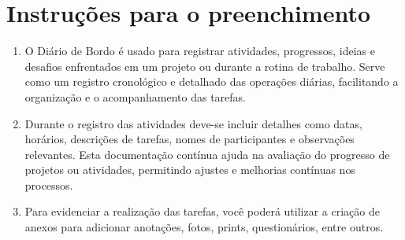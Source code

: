 \documentclass[
landscape,
  a4paper,%
  12pt,%
  english,%
  brazilian,%
]{article}
\begin{document}





\section*{Instruções para o preenchimento}
\doublespacing
\begin{enumerate}
    \item O Diário de Bordo é usado para registrar atividades, progressos, ideias e desafios enfrentados em um projeto ou durante a rotina de trabalho. Serve como um registro cronológico e detalhado das operações diárias, facilitando a organização e o acompanhamento das tarefas.
    \doublespacing
    \item Durante o registro das atividades deve-se incluir detalhes como datas, horários, descrições de tarefas, nomes de participantes e observações relevantes.  Esta documentação contínua ajuda na avaliação do progresso de projetos ou atividades, permitindo ajustes e melhorias contínuas nos processos.
    \doublespacing
    \item Para evidenciar a realização das tarefas, você poderá utilizar a criação de anexos para adicionar anotações, fotos, prints, questionários, entre outros.
\end{enumerate}

\break
\end{document}
